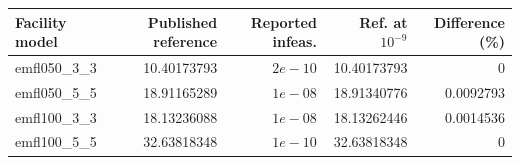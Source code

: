 \begin{tabular}{@{}lrrrr@{}}
\toprule
Facility model & Published reference & Reported infeas. & Ref. at $10^{-9}$ & Difference (\%)\\
\midrule
emfl050\_3\_3 & 10.40173793 & $2e-10$ & 10.40173793 & 0\\
emfl050\_5\_5 & 18.91165289 & $1e-08$ & 18.91340776 & 0.0092793\\
emfl100\_3\_3 & 18.13236088 & $1e-08$ & 18.13262446 & 0.0014536\\
emfl100\_5\_5 & 32.63818348 & $1e-10$ & 32.63818348 & 0\\
\bottomrule
\end{tabular}
